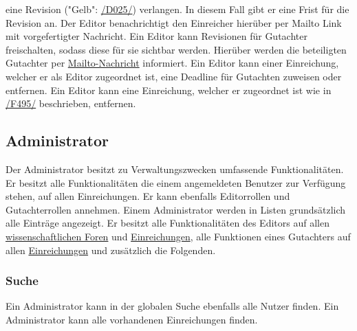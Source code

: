 \begin{description}
    eine Revision ("Gelb": \hyperref[d025]{/D025/}) verlangen. In diesem Fall gibt er eine Frist für die Revision an.
    Der Editor benachrichtigt den Einreicher hierüber per Mailto Link mit vorgefertigter Nachricht.
     Ein Editor kann Revisionen für Gutachter freischalten, sodass diese für sie sichtbar werden.
    Hierüber werden die beteiligten Gutachter per \hyperref[glo:mailto]{Mailto-Nachricht} informiert.
     Ein Editor kann einer Einreichung, welcher er als Editor zugeordnet ist, eine Deadline für
    Gutachten zuweisen oder entfernen.
     Ein Editor kann eine Einreichung, welcher er zugeordnet ist wie in
    \hyperref[funkt:495]{/F495/} beschrieben, entfernen.
\end{description}

\subsection{Administrator}
Der Administrator besitzt zu Verwaltungszwecken umfassende Funktionalitäten. Er besitzt alle Funktionalitäten die
einem angemeldeten Benutzer zur Verfügung stehen, auf allen Einreichungen. Er kann ebenfalls Editorrollen und Gutachterrollen annehmen.
Einem Administrator werden in Listen grundsätzlich alle Einträge angezeigt.
Er besitzt alle Funktionalitäten des Editors auf allen \hyperref[ed:wissFor]{wissenschaftlichen Foren} und \hyperref[ed:ein]{Einreichungen},
alle Funktionen eines Gutachters auf allen \hyperref[gut:ein]{Einreichungen}
und zusätzlich die Folgenden.

\subsubsection{Suche}
\begin{description}
     Ein Administrator kann in der globalen Suche ebenfalls alle Nutzer finden.
     Ein Administrator kann alle vorhandenen Einreichungen finden.
\end{description}


